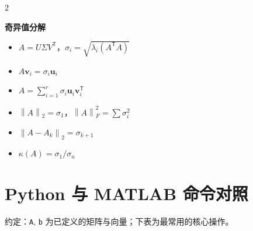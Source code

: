 \documentclass[11pt,a4paper,openany]{ctexbook}
\newcommand{\norm}[1]{\left\lVert #1 \right\rVert}
\newcommand{\minihead}[1]{%
  \par\addvspace{8pt}%
  {\noindent\sffamily\bfseries\large\color{qing} #1\par}%
  \vspace{-4pt}\noindent{\color{qing!28}\rule{\linewidth}{0.6pt}}\par\vspace{5pt}}
\begin{document}
\begin{multicols}{2}
\minihead{奇异值分解}
\begin{itemize}[leftmargin=1.4em, itemsep=2pt]
\item $A=U\Sigma V^{\mathsf T}$，$\sigma_i=\sqrt{\lambda_i(A^{\mathsf T}A)}$
\item $A\boldsymbol{v}_i=\sigma_i\boldsymbol{u}_i$
\item $A=\sum_{i=1}^{r}\sigma_i\boldsymbol{u}_i\boldsymbol{v}_i^{\mathsf T}$
\item $\norm{A}_2=\sigma_1$，$\norm{A}_F^2=\sum\sigma_i^2$
\item $\norm{A-A_k}_2=\sigma_{k+1}$
\item $\kappa(A)=\sigma_1/\sigma_n$
\end{itemize}

\end{multicols}

\chapter{Python 与 MATLAB 命令对照}
\label{app:code}

\begin{center}
{\small\sffamily\color{inkl}
约定：\texttt{A}, \texttt{b} 为已定义的矩阵与向量；下表为最常用的核心操作。}
\end{center}
\end{document}

